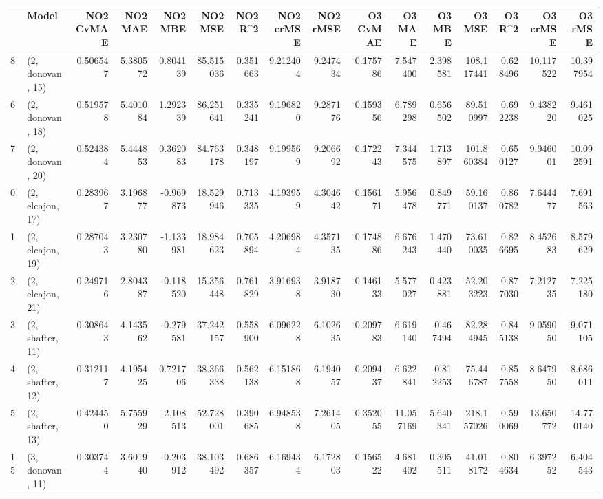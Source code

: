 \begin{tabular}{llrrrrrrrrrrrrrr}
\toprule
{} &             Model &  NO2 CvMAE &   NO2 MAE &   NO2 MBE &    NO2 MSE &   NO2 R\textasciicircum2 &  NO2 crMSE &  NO2 rMSE &  O3 CvMAE &     O3 MAE &    O3 MBE &      O3 MSE &    O3 R\textasciicircum2 &   O3 crMSE &    O3 rMSE \\
\midrule
8  &  (2, donovan, 15) &   0.506547 &  5.380572 &  0.804139 &  85.515036 &  0.351663 &   9.212404 &  9.247434 &  0.175786 &   7.547400 &  2.398581 &  108.117441 &  0.628496 &  10.117522 &  10.397954 \\
6  &  (2, donovan, 18) &   0.519578 &  5.401084 &  1.292339 &  86.251641 &  0.335241 &   9.196820 &  9.287176 &  0.159356 &   6.789298 &  0.656502 &   89.510997 &  0.692238 &   9.438220 &   9.461025 \\
7  &  (2, donovan, 20) &   0.524384 &  5.444853 &  0.362083 &  84.763178 &  0.348197 &   9.199569 &  9.206692 &  0.172243 &   7.344575 &  1.713897 &  101.860384 &  0.650127 &   9.946001 &  10.092591 \\
0  &  (2, elcajon, 17) &   0.283967 &  3.196877 & -0.969873 &  18.529946 &  0.713335 &   4.193959 &  4.304642 &  0.156171 &   5.956478 &  0.849771 &   59.160137 &  0.860782 &   7.644477 &   7.691563 \\
1  &  (2, elcajon, 19) &   0.287043 &  3.230780 & -1.133981 &  18.984623 &  0.705894 &   4.206984 &  4.357135 &  0.174886 &   6.676243 &  1.470440 &   73.610035 &  0.826695 &   8.452683 &   8.579629 \\
2  &  (2, elcajon, 21) &   0.249716 &  2.804387 & -0.118520 &  15.356448 &  0.761829 &   3.916938 &  3.918730 &  0.146133 &   5.577027 &  0.423881 &   52.203223 &  0.877030 &   7.212735 &   7.225180 \\
3  &  (2, shafter, 11) &   0.308643 &  4.143562 & -0.279581 &  37.242157 &  0.558900 &   6.096228 &  6.102635 &  0.209783 &   6.619140 & -0.467494 &   82.284945 &  0.845138 &   9.059050 &   9.071105 \\
4  &  (2, shafter, 12) &   0.312117 &  4.195425 &  0.721706 &  38.366338 &  0.562138 &   6.151868 &  6.194057 &  0.209437 &   6.622841 & -0.812253 &   75.446787 &  0.857558 &   8.647950 &   8.686011 \\
5  &  (2, shafter, 13) &   0.424450 &  5.755929 & -2.108513 &  52.728001 &  0.390685 &   6.948538 &  7.261405 &  0.352055 &  11.057169 &  5.640341 &  218.157026 &  0.590069 &  13.650772 &  14.770140 \\
15 &  (3, donovan, 11) &   0.303744 &  3.601940 & -0.203912 &  38.103492 &  0.686357 &   6.169434 &  6.172803 &  0.156522 &   4.681402 &  0.305511 &   41.018172 &  0.804634 &   6.397252 &   6.404543 \\

\end{tabular}

